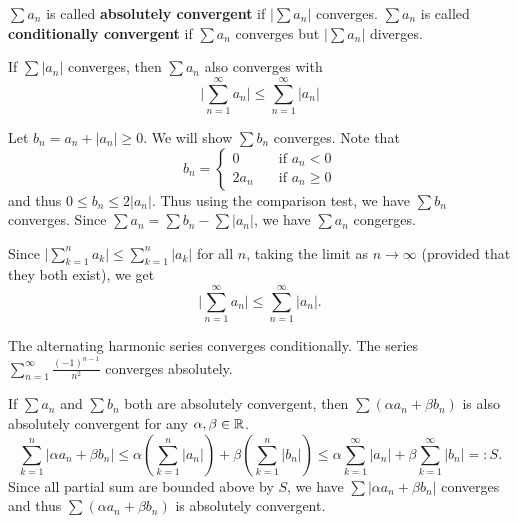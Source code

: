     \begin{definitionenv}
        $\sum a_n$ is called \textbf{absolutely convergent} if $\big|\sum a_n\big|$ converges. $\sum a_n$ is called \textbf{conditionally convergent} if $\sum a_n$ converges but  $\big|\sum a_n\big|$ diverges.
    \end{definitionenv}
    \begin{theoremenv}
        If $\sum |a_n|$ converges, then $\sum a_n$ also converges with
        \[
        \Big|\sum_{n=1}^\infty a_n\Big| \le \sum_{n=1}^\infty |a_n|
        \]
    \end{theoremenv}
    \begin{proofenv}
        Let $b_n = a_n + |a_n| \ge 0$. We will show $\sum b_n$ converges. Note that
        \[
        b_n = \begin{cases}
            0 \quad & \text{if } a_n < 0\\
            2a_n \quad & \text{if } a_n \ge 0
        \end{cases}
        \]
        and thus $0\le b_n \le 2|a_n|$. Thus using the comparison test, we have $\sum b_n$ converges. Since $\sum a_n = \sum b_n - \sum |a_n|$, we have $\sum a_n$ congerges.

        Since $\displaystyle \Big|\sum_{k=1}^n a_k \Big| \le \sum_{k=1}^n |a_k|$ for all $n$, taking the limit as $n \to \infty$ (provided that they both exist), we get
        \[
        \Big|\sum_{n=1}^\infty a_n\Big| \le \sum_{n=1}^\infty |a_n|.
        \]
    \end{proofenv}
    \begin{exampleenv}
        The alternating harmonic series converges conditionally. The series $\displaystyle \sum_{n=1}^\infty  \frac{(-1)^{n-1}}{n^2}$ converges absolutely.
    \end{exampleenv}
    \begin{theoremenv}
        If $\sum a_n$ and $\sum b_n$ both are absolutely convergent, then $\sum (\alpha a_n + \beta b_n)$ is also absolutely convergent for any $\alpha,\beta \in \mathbb{R}$.
        $$ \sum_{k=1}^n|\alpha a_n + \beta b_n| \le \alpha \left( \sum_{k=1}^n |a_n| \right) + \beta \left( \sum_{k=1}^n |b_n| \right) \le \alpha \sum_{k=1}^{\infty} |a_n| + \beta \sum_{k=1}^\infty |b_n| =: S.$$
        Since all partial sum are bounded above by $S$, we have $\sum |\alpha a_n + \beta b_n|$ converges and thus $\sum (\alpha a_n + \beta b_n)$ is absolutely convergent.
    \end{theoremenv}
